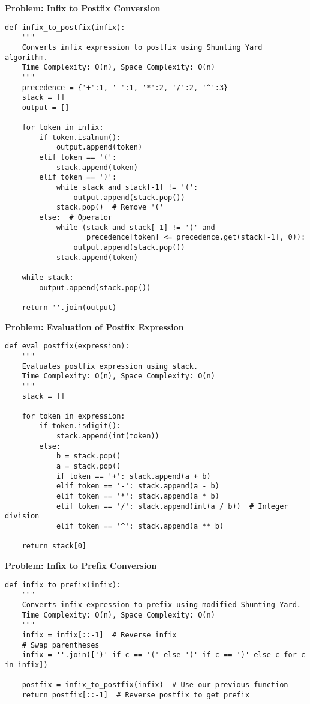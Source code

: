 \noindent\textbf{Problem: Infix to Postfix Conversion}
\begin{verbatim}
def infix_to_postfix(infix):
    """
    Converts infix expression to postfix using Shunting Yard algorithm.
    Time Complexity: O(n), Space Complexity: O(n)
    """
    precedence = {'+':1, '-':1, '*':2, '/':2, '^':3}
    stack = []
    output = []
    
    for token in infix:
        if token.isalnum():
            output.append(token)
        elif token == '(':
            stack.append(token)
        elif token == ')':
            while stack and stack[-1] != '(':
                output.append(stack.pop())
            stack.pop()  # Remove '('
        else:  # Operator
            while (stack and stack[-1] != '(' and 
                   precedence[token] <= precedence.get(stack[-1], 0)):
                output.append(stack.pop())
            stack.append(token)
    
    while stack:
        output.append(stack.pop())
    
    return ''.join(output)
\end{verbatim}

\noindent\textbf{Problem: Evaluation of Postfix Expression}
\begin{verbatim}
def eval_postfix(expression):
    """
    Evaluates postfix expression using stack.
    Time Complexity: O(n), Space Complexity: O(n)
    """
    stack = []
    
    for token in expression:
        if token.isdigit():
            stack.append(int(token))
        else:
            b = stack.pop()
            a = stack.pop()
            if token == '+': stack.append(a + b)
            elif token == '-': stack.append(a - b)
            elif token == '*': stack.append(a * b)
            elif token == '/': stack.append(int(a / b))  # Integer division
            elif token == '^': stack.append(a ** b)
    
    return stack[0]
\end{verbatim}

\noindent\textbf{Problem: Infix to Prefix Conversion}
\begin{verbatim}
def infix_to_prefix(infix):
    """
    Converts infix expression to prefix using modified Shunting Yard.
    Time Complexity: O(n), Space Complexity: O(n)
    """
    infix = infix[::-1]  # Reverse infix
    # Swap parentheses
    infix = ''.join([')' if c == '(' else '(' if c == ')' else c for c in infix])
    
    postfix = infix_to_postfix(infix)  # Use our previous function
    return postfix[::-1]  # Reverse postfix to get prefix
\end{verbatim}

